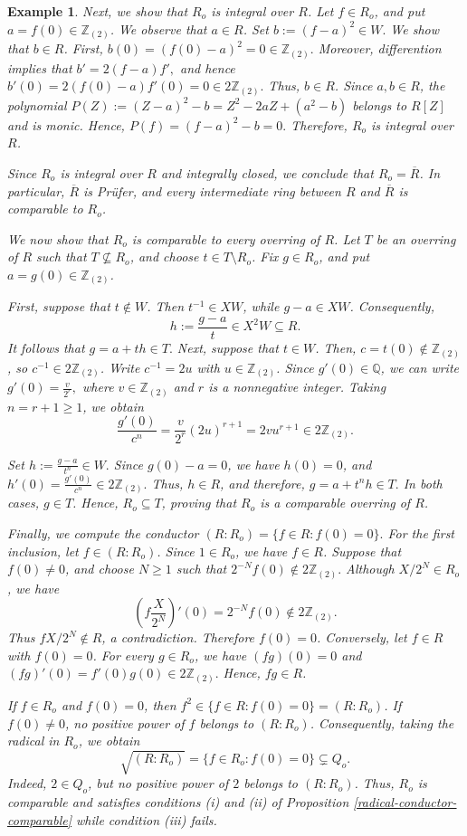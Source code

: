 \documentclass[12pt]{article}
\newtheorem{example}{Example}
\begin{document}
\begin{example}
		Next, we show that $R_o$ is integral over $R$. Let $f\in R_o$, and put $a=f(0)\in\mathbb Z_{(2)}$. We observe that $a\in R$. Set $b:=(f-a)^2\in W.$ We show that $b\in R$. First, $b(0)=(f(0)-a)^2=0\in\mathbb Z_{(2)}.$ Moreover, differention implies that $b'=2(f-a)f',$ and hence $b'(0)=2(f(0)-a)f'(0)=0\in2\mathbb Z_{(2)}.$ Thus, $b\in R$. Since $a,b\in R$, the polynomial $P(Z):=(Z-a)^2-b =Z^2-2aZ+(a^2-b)$ belongs to $R[Z]$ and is monic. Hence, $P(f)=(f-a)^2-b=0.$ Therefore, $R_o$ is integral over $R$.
		
		Since $R_o$ is integral over $R$ and integrally closed, we conclude that $R_o=\overline R$. In particular, $\overline R$ is Prüfer, and every intermediate ring between $R$ and $\overline R$
		is comparable to $R_o$.\bigskip
		
		We now show that $R_o$ is comparable to every overring of $R$. Let $T$ be an overring of $R$ such that $T\nsubseteq R_o$, and choose $t\in T\setminus R_o$. Fix $g\in R_o$, and put $a=g(0)\in \mathbb Z_{(2)}$.
		
		First, suppose that $t\notin W$. Then $t^{-1}\in XW$, while $g-a\in XW$. Consequently, $$h:=\displaystyle\frac{g-a}{t}\in X^2W\subseteq R.$$ It follows that $g=a+th\in T. $ Next, suppose that $t\in W$. Then, $c=t(0)\notin \mathbb Z_{(2)}$, so $c^{-1}\in2\mathbb Z_{(2)}$. Write $c^{-1}=2u$ with $u\in\mathbb Z_{(2)}$. Since $g'(0)\in\mathbb Q$, we can write $g'(0)=\displaystyle\frac{v}{2^r}, $ where $v\in\mathbb Z_{(2)}$ and $r$ is a nonnegative integer. Taking $n=r+1\geq1$, we obtain 
		\[ \frac{g'(0)}{c^n} =\frac{v}{2^r}(2u)^{r+1} =2vu^{r+1}\in2\mathbb Z_{(2)}. \]
		
		Set $h:=\displaystyle\frac{g-a}{t^n}\in W.$ Since $g(0)-a=0$, we have $h(0)=0$, and $ h'(0)=\displaystyle\frac{g'(0)}{c^n}\in2\mathbb Z_{(2)}.$ Thus, $h\in R$, and therefore, $g=a+t^nh\in T.$ In both cases, $g\in T$. Hence, $R_o\subseteq T$, proving that $R_o$ is a comparable overring of $R$.
		
		\medskip Finally, we compute the conductor $(R:R_o)=\{f\in R:f(0)=0\}.$ For the first inclusion, let $f\in(R:R_o)$.
		Since $1\in R_o$, we have $f\in R$.
		Suppose that $f(0)\neq0$, and choose $N\geq1$ such that $2^{-N}f(0)\notin2\mathbb Z_{(2)}.$ Although $X/2^N\in R_o$, we have
		\[ \left(f\frac{X}{2^N}\right)'(0)=2^{-N}f(0)\notin2\mathbb Z_{(2)}. \]
		Thus $fX/2^N\notin R$, a contradiction. Therefore $f(0)=0$. Conversely, let $f\in R$ with $f(0)=0$. For every $g\in R_o$, we have $(fg)(0)=0$ and $ (fg)'(0)=f'(0)g(0)\in2\mathbb Z_{(2)}.$ Hence, $fg\in R$.\medskip
		
		If $f\in R_o$ and $f(0)=0$, then $f^2\in \{f\in R:f(0)=0\}=(R:R_o)$. If $f(0)\neq0$, no positive power of $f$ belongs to $(R:R_o)$. Consequently, taking the radical in $R_o$, we obtain
		\[
		\sqrt{(R:R_o)}
		=\{f\in R_o:f(0)=0\}
		\subsetneq Q_o.
		\]
		Indeed, $2\in Q_o$, but no positive power of $2$ belongs to $(R:R_o)$. Thus, $R_o$ is comparable and satisfies conditions (i) and (ii) of Proposition \ref{radical-conductor-comparable} while condition (iii) fails.
	\end{example}
\end{document}
